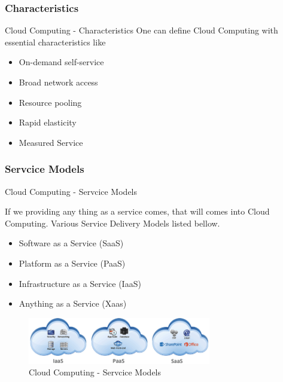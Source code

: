 \documentclass[xcolor=dvipsnames]{beamer}
\begin{document}
\subsubsection{Characteristics}
\begin{frame} {Cloud Computing - Characteristics }
One can define Cloud Computing with essential characteristics like

\begin{itemize}
\item On-demand self-service
\item Broad network access
\item Resource pooling
\item Rapid elasticity
\item Measured Service
\end{itemize}
\end{frame}
\subsubsection{Servcice Models}
\begin{frame}{Cloud Computing - Servcice Models }

If we providing any thing as a service comes, that will comes into Cloud Computing. Various Service Delivery Models listed bellow.

\begin{itemize}
\item Software as a Service (SaaS) 
\item Platform as a Service (PaaS)
\item Infrastructure as a Service (IaaS)
\item Anything as a Service (Xaas)
\end{itemize}
\begin{figure}[H]
 \centering
 \includegraphics[width=8cm]{./service.png}
 \caption{Cloud Computing - Servcice Models \label{fig:Cloud Computing - Servcice Models} }
\end{figure}

\end{frame}
\end{document}
